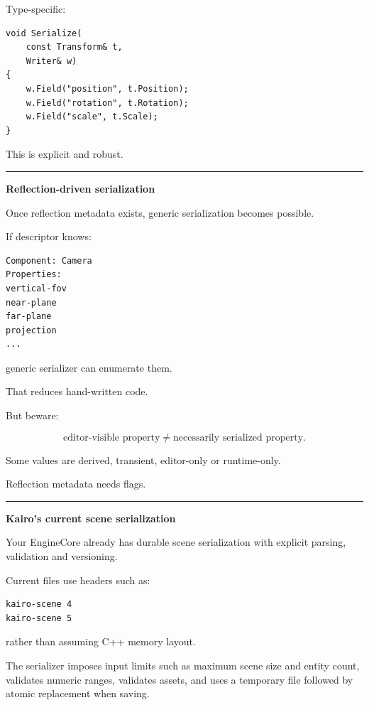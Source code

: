 Type-specific:

\begin{verbatim}
void Serialize(
    const Transform& t,
    Writer& w)
{
    w.Field("position", t.Position);
    w.Field("rotation", t.Rotation);
    w.Field("scale", t.Scale);
}
\end{verbatim}

This is explicit and robust.

\begin{center}\rule{0.5\linewidth}{0.5pt}\end{center}

\textbf{Reflection-driven serialization}

Once reflection metadata exists, generic serialization becomes possible.

If descriptor knows:

\begin{verbatim}
Component: Camera
Properties:
vertical-fov
near-plane
far-plane
projection
...
\end{verbatim}

generic serializer can enumerate them.

That reduces hand-written code.

But beware:

\[
\boxed{
\text{editor-visible property}
\neq
\text{necessarily serialized property}.
}
\]

Some values are derived, transient, editor-only or runtime-only.

Reflection metadata needs flags.

\begin{center}\rule{0.5\linewidth}{0.5pt}\end{center}

\textbf{Kairo's current scene serialization}

Your EngineCore already has durable scene serialization with explicit parsing, validation and versioning.

Current files use headers such as:

\begin{verbatim}
kairo-scene 4
kairo-scene 5
\end{verbatim}

rather than assuming C++ memory layout.

The serializer imposes input limits such as maximum scene size and entity count, validates numeric ranges, validates assets, and uses a temporary file followed by atomic replacement when saving.

